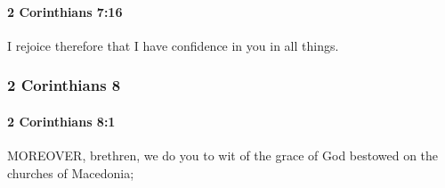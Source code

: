 		\paragraph{2 Corinthians 7:16} %
			\label{2CORINTHIANS-7-16}

			I rejoice therefore that I have confidence in you in all things.

			\begin{framed}
			\scriptsize
				\begin{compactdesc}
					\item[SBLG] 
				\end{compactdesc}
			\end{framed}

	\subsubsection{2 Corinthians 8} %
		\label{2CORINTHIANS-8}

		\paragraph{2 Corinthians 8:1} %
			\label{2CORINTHIANS-8-1}

			MOREOVER, brethren, we do you to wit of the grace of God bestowed on the churches of Macedonia;

